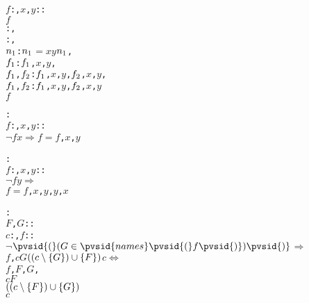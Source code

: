 \begin{alltt}
  \pvsid{(}\(f\): , \(x\), \(y\): \pvsid{)}:   \pvskey{=}
     \(f\) 
      : ,
      : ,
      \pvsid{(}\(n\sb{1}\)\pvsid{)}:  \pvsid{(}\(n\sb{1}\) \(=\) \(x\)\pvsid{)}  \pvsid{(}\(y\)\pvsid{)}  \pvsid{(}\(n\sb{1}\)\pvsid{)} ,
      \pvsid{(}\(f\sb{1}\)\pvsid{)}: \pvsid{(}\pvsid{(}\(f\sb{1}\), \(x\), \(y\)\pvsid{)}\pvsid{)},
      \pvsid{(}\(f\sb{1}\), \(f\sb{2}\)\pvsid{)}: \pvsid{(}\pvsid{(}\(f\sb{1}\), \(x\), \(y\)\pvsid{)}, \pvsid{(}\(f\sb{2}\), \(x\), \(y\)\pvsid{)}\pvsid{)},
      \pvsid{(}\(f\sb{1}\), \(f\sb{2}\)\pvsid{)}: \pvsid{(}\pvsid{(}\(f\sb{1}\), \(x\), \(y\)\pvsid{)}, \pvsid{(}\(f\sb{2}\), \(x\), \(y\)\pvsid{)}\pvsid{)}
      \pvsid{(}\(f\)\pvsid{)}\vspace*{\pvsdeclspacing}

  : 
     \pvsid{(}\(f\): , \(x\), \(y\): \pvsid{)}:
      \(\neg\) \pvsid{(}\pvsid{(}\(f\)\pvsid{)}\pvsid{(}\(x\)\pvsid{)}\pvsid{)} \(\Rightarrow\) \(f\) \(=\) \pvsid{(}\pvsid{(}\(f\), \(x\), \(y\)\pvsid{)}\pvsid{)}\vspace*{\pvsdeclspacing}

  : 
     \pvsid{(}\(f\): , \(x\), \(y\): \pvsid{)}:
      \(\neg\) \pvsid{(}\pvsid{(}\(f\)\pvsid{)}\pvsid{(}\(y\)\pvsid{)}\pvsid{)} \(\Rightarrow\)
       \(f\) \(=\) \pvsid{(}\pvsid{(}\(f\), \(x\), \(y\)\pvsid{)}, \(y\), \(x\)\pvsid{)}\vspace*{\pvsdeclspacing}

  : 
     \pvsid{(}\(F\), \(G\): \pvsid{)}:
      \pvsid{(} \pvsid{(}\(c\): , \(f\): \pvsid{)}:
          \(\neg\) \(\pvsid{(}\setsothermembertwofn{G}{\pvsid{names}\pvsid{(}f\pvsid{)}}\pvsid{)}\) \(\Rightarrow\)
           \pvsid{(}\pvsid{(}\(f\),  \pvsid{(}\(c\)\pvsid{(}\(G\)\pvsid{)}\pvsid{)}  \(\setsotheraddtwofn{F}{\setsotherremovetwofn{G}{c}}\)  \(c\) \pvsid{)} \(\Leftrightarrow\)
              \pvsid{(}\pvsid{(}\(f\), \(F\), \(G\)\pvsid{)},
                          \pvsid{(}\(c\)\pvsid{(}\(F\)\pvsid{)}\pvsid{)}
                            \(\setsotheraddtwofn{G}{\setsotherremovetwofn{F}{c}}\)
                          \(c\)
                         \pvsid{)}\pvsid{)}\pvsid{)}\vspace*{\pvsdeclspacing}


\end{alltt}
